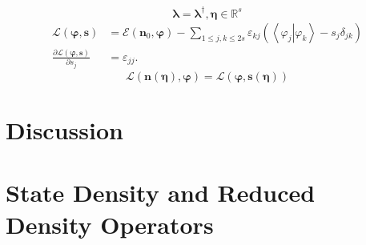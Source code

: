 \documentclass[aps,preprint]{revtex4}%
\begin{document}
\begin{equation}
\boldsymbol{\lambda}=\boldsymbol{\lambda}^{\dagger},\boldsymbol{\eta\in
}\mathbb{R}^{s}%
\end{equation}%
\begin{align}
\mathcal{L}\left(  \boldsymbol{\varphi,s}\right)   &  =\mathcal{E}\left(
\boldsymbol{n}_{0}\boldsymbol{,\varphi}\right)  -\sum_{1\leq j,k\leq
2s}\varepsilon_{kj}\left(  \left\langle \left.  \varphi_{j}\right\vert
\varphi_{k}\right\rangle -s_{j}\delta_{jk}\right) \\
\frac{\partial\mathcal{L}\left(  \boldsymbol{\varphi,s}\right)  }{\partial
s_{j}}  &  =\varepsilon_{jj}.
\end{align}%
\begin{equation}
\mathcal{L}\left(  \boldsymbol{n\left(  \boldsymbol{\eta}\right)  ,\varphi
}\right)  =\mathcal{L}\left(  \boldsymbol{\varphi,s}\left(  \boldsymbol{\eta
}\right)  \right)
\end{equation}


\section{Discussion}

\appendix


\section{State Density and Reduced Density Operators \label{Denmat}}
\end{document}
